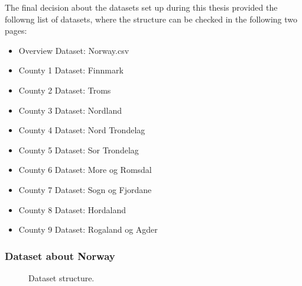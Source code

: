 The final decision about the datasets set up during this thesis provided the followng list of datasets, where the structure can be checked in the following two pages:
 \setlength{\itemsep}{-5pt}
\begin{itemize}
\item Overview Dataset: Norway.csv
\vspace{-2mm}
\item County 1 Dataset: Finnmark
\vspace{-2mm}
\item County 2 Dataset: Troms
\vspace{-2mm}
\item County 3 Dataset: Nordland
\vspace{-2mm}
\item County 4 Dataset: Nord Trondelag
\vspace{-2mm}
\item County 5 Dataset: Sor Trondelag
\vspace{-2mm}
\item County 6 Dataset: More og Romsdal
\vspace{-2mm}
\item County 7 Dataset: Sogn og Fjordane
\vspace{-2mm}
\item County 8 Dataset: Hordaland
\vspace{-2mm}
\item County 9 Dataset: Rogaland og Agder
\end{itemize}

\newpage

\subsubsection{Dataset about Norway}

\begin{figure}[H]
    \caption{Dataset structure.}
\end{figure}

